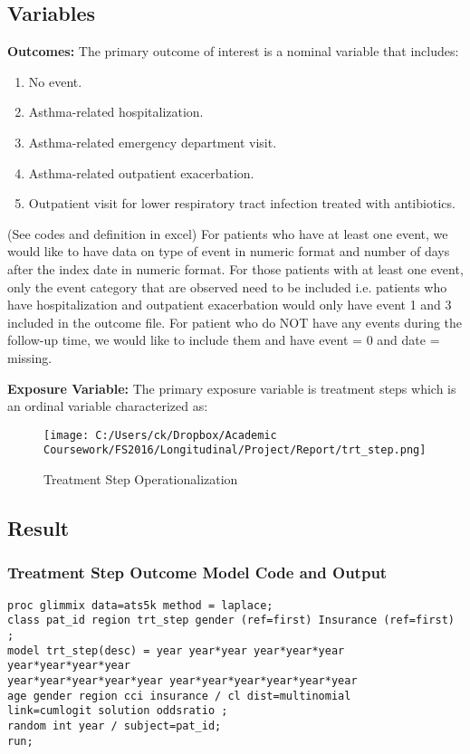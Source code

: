 \documentclass[10pt,a4paper,fleqn]{article}
\begin{document}
{\subsection{Variables}
\label{va}
\textbf{Outcomes:}
The primary outcome of interest is a nominal variable that includes:
\begin{enumerate}
  \item No event.
  \item Asthma-related hospitalization.
  \item Asthma-related emergency department visit.
  \item Asthma-related outpatient exacerbation.
  \item Outpatient visit for lower respiratory tract infection treated with antibiotics. 
\end{enumerate}

(See codes and definition in excel)
For patients who have at least one event, we would like to have data on type of event in numeric format and number of days after the index date in numeric format. For those patients with at least one event, only the event category that are observed need to be included i.e. patients who have hospitalization and outpatient exacerbation would only have event 1 and 3 included in the outcome file.
For patient who do NOT have any events during the follow-up time, we would like to include them and have event = 0 and date = missing. 


\textbf{Exposure Variable:}
The primary exposure variable is treatment steps which is an ordinal variable characterized as:
\begin{figure}[!htbp]
\caption{Treatment Step Operationalization}
\label{ts}
\texttt{[image: C:/Users/ck/Dropbox/Academic Coursework/FS2016/Longitudinal/Project/Report/trt\_step.png]}
\end{figure}
\newpage

\subsection{Result}
\subsubsection{Treatment Step Outcome Model Code and Output}
\label{tsmo}
\begin{lstlisting}
proc glimmix data=ats5k method = laplace;
class pat_id region trt_step gender (ref=first) Insurance (ref=first) ;
model trt_step(desc) = year year*year year*year*year year*year*year*year
year*year*year*year*year year*year*year*year*year*year 
age gender region cci insurance / cl dist=multinomial 
link=cumlogit solution oddsratio ;
random int year / subject=pat_id;
run;
\end{lstlisting}

}
\end{document}

